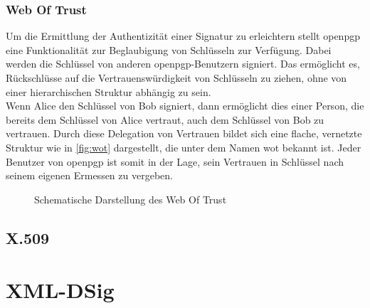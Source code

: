 \subsubsection{Web Of Trust}
Um die Ermittlung der Authentizität einer Signatur zu erleichtern stellt \gls{openpgp} eine Funktionalität zur Beglaubigung von Schlüsseln zur Verfügung. Dabei
werden die Schlüssel von anderen \gls{openpgp}-Benutzern signiert. Das ermöglicht es, Rückschlüsse auf die Vertrauenswürdigkeit von Schlüsseln zu ziehen, ohne
von einer hierarchischen Struktur abhängig zu sein.\\

Wenn Alice den Schlüssel von Bob signiert, dann ermöglicht dies einer Person, die bereits dem Schlüssel von Alice vertraut, auch dem Schlüssel von Bob zu
vertrauen. Durch diese Delegation von Vertrauen bildet sich eine flache, vernetzte Struktur wie in \autoref{fig:wot} dargestellt, die unter dem Namen \gls{wot}
bekannt ist. Jeder Benutzer von \gls{openpgp} ist somit in der Lage, sein Vertrauen in Schlüssel nach seinem eigenen Ermessen zu vergeben.

\begin{figure}
\centering

\caption{Schematische Darstellung des Web Of Trust}
\label{fig:wot}
\end{figure}

\subsection{X.509}
\label{sec:GrundlagenDefinitionen:DigitaleSignaturen:Verfahren:x509}

\section{XML-DSig}
\label{sec:GrundlagenDefinitionen:xml-dsig}
